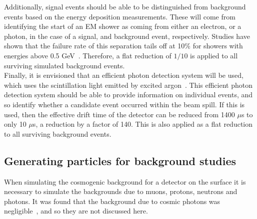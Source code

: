 Additionally, signal events should be able to be distinguished from background events based on the energy deposition measurements. These will come from identifying the start of an EM shower as coming from either an electron, or a photon, in the case of a signal, and background event, respectively. Studies have shown that the failure rate of this separation tails off at 10\% for showers with energies above 0.5 GeV~\citep{LBNE8458}. Therefore, a flat reduction of $1/10$ is applied to all surviving simulated background events. \\

Finally, it is envisioned that an efficient photon detection system will be used, which uses the scintillation light emitted by excited argon~\citep{PhysRevB.27.5279}. This efficient photon detection system should be able to provide information on individual events, and so identify whether a candidate event occurred within the beam spill. If this is used, then the effective drift time of the detector can be reduced from 1400 $\mu$s to only 10 $\mu$s, a reduction by a factor of 140. This is also applied as a flat reduction to all surviving background events. \\


\subsection{Generating particles for background studies}
When simulating the cosmogenic background for a detector on the surface it is necessary to simulate the backgrounds due to muons, protons, neutrons and photons. It was found that the background due to cosmic photons was negligible~\citep{MartinsThesis}, and so they are not discussed here. \\


